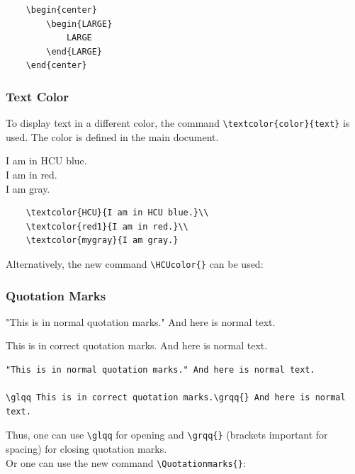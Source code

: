 \begin{verbatim}
    \begin{center}
        \begin{LARGE}
            LARGE
        \end{LARGE}
    \end{center}
\end{verbatim}


\subsubsection{Text Color}

To display text in a different color, the command \verb|\textcolor{color}{text}| is used. The color is defined in the main document.

\textcolor{HCU}{I am in HCU blue.}\\
\textcolor{red1}{I am in red.}\\
\textcolor{mygray}{I am gray.}

\begin{verbatim}
    \textcolor{HCU}{I am in HCU blue.}\\
    \textcolor{red1}{I am in red.}\\
    \textcolor{mygray}{I am gray.}
\end{verbatim}

Alternatively, the new command \verb|\HCUcolor{}| can be used:



\subsubsection{Quotation Marks}

"This is in normal quotation marks." And here is normal text.

\glqq This is in correct quotation marks.\grqq{} And here is normal text.

\begin{verbatim}
"This is in normal quotation marks." And here is normal text.

\glqq This is in correct quotation marks.\grqq{} And here is normal text.
\end{verbatim}

Thus, one can use \verb|\glqq| for opening and \verb|\grqq{}| (brackets important for spacing) for closing quotation marks.\\

Or one can use the new command \verb|\Quotationmarks{}|:

